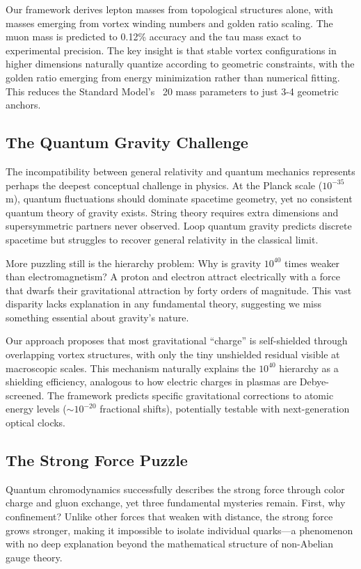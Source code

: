 Our framework derives lepton masses from topological structures alone, with masses emerging from vortex winding numbers and golden ratio scaling. The muon mass is predicted to 0.12\% accuracy and the tau mass exact to experimental precision. The key insight is that stable vortex configurations in higher dimensions naturally quantize according to geometric constraints, with the golden ratio emerging from energy minimization rather than numerical fitting. This reduces the Standard Model's ~20 mass parameters to just 3-4 geometric anchors.

\subsection{The Quantum Gravity Challenge}

The incompatibility between general relativity and quantum mechanics represents perhaps the deepest conceptual challenge in physics. At the Planck scale ($10^{-35}$ m), quantum fluctuations should dominate spacetime geometry, yet no consistent quantum theory of gravity exists. String theory requires extra dimensions and supersymmetric partners never observed. Loop quantum gravity \cite{rovelli2008loop} predicts discrete spacetime but struggles to recover general relativity in the classical limit.

More puzzling still is the hierarchy problem: Why is gravity $10^{40}$ times weaker than electromagnetism? A proton and electron attract electrically with a force that dwarfs their gravitational attraction by forty orders of magnitude. This vast disparity lacks explanation in any fundamental theory, suggesting we miss something essential about gravity's nature.

Our approach proposes that most gravitational ``charge'' is self-shielded through overlapping vortex structures, with only the tiny unshielded residual visible at macroscopic scales. This mechanism naturally explains the $10^{40}$ hierarchy as a shielding efficiency, analogous to how electric charges in plasmas are Debye-screened. The framework predicts specific gravitational corrections to atomic energy levels ($\sim 10^{-20}$ fractional shifts), potentially testable with next-generation optical clocks.

\subsection{The Strong Force Puzzle}

Quantum chromodynamics successfully describes the strong force through color charge and gluon exchange, yet three fundamental mysteries remain. First, why confinement? Unlike other forces that weaken with distance, the strong force grows stronger, making it impossible to isolate individual quarks---a phenomenon with no deep explanation beyond the mathematical structure of non-Abelian gauge theory.


